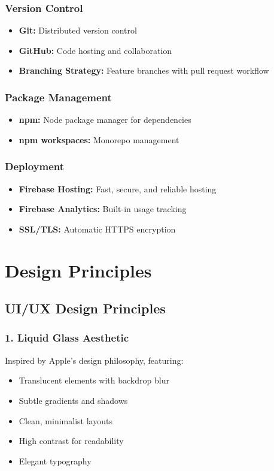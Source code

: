 \documentclass[12pt,a4paper]{report}
\begin{document}
\subsubsection*{Version Control}
\begin{itemize}
    \item \textbf{Git:} Distributed version control
    \item \textbf{GitHub:} Code hosting and collaboration
    \item \textbf{Branching Strategy:} Feature branches with pull request workflow
\end{itemize}

\subsubsection*{Package Management}
\begin{itemize}
    \item \textbf{npm:} Node package manager for dependencies
    \item \textbf{npm workspaces:} Monorepo management
\end{itemize}

\subsubsection*{Deployment}
\begin{itemize}
    \item \textbf{Firebase Hosting:} Fast, secure, and reliable hosting
    \item \textbf{Firebase Analytics:} Built-in usage tracking
    \item \textbf{SSL/TLS:} Automatic HTTPS encryption
\end{itemize}

\section{Design Principles}

\subsection*{UI/UX Design Principles}

\subsubsection*{1. Liquid Glass Aesthetic}
Inspired by Apple's design philosophy, featuring:
\begin{itemize}
    \item Translucent elements with backdrop blur
    \item Subtle gradients and shadows
    \item Clean, minimalist layouts
    \item High contrast for readability
    \item Elegant typography
\end{itemize}
\end{document}

